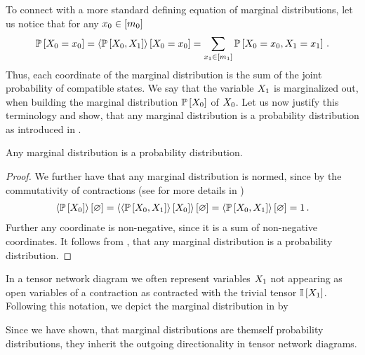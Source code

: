 To connect with a more standard defining equation of marginal distributions, let us notice that for any $x_{0}\in[m_{0}]$
\begin{align*}
    \mathbb{P}\left[X_{0}=x_{0}\right]
    = \left\langle \mathbb{P}\left[X_{0},X_{1}\right]\right\rangle \left[ X_{0}=x_{0} \right]
    = \sum_{x_{1}\in[m_{1}]} \mathbb{P}\left[X_{0}=x_{0},X_{1}=x_{1}\right] \, .
\end{align*}
Thus, each coordinate of the marginal distribution is the sum of the joint probability of compatible states.
We say that the variable $X_{1}$ is marginalized out, when building the marginal distribution $\mathbb{P}\left[X_{0}\right]$ of $X_{0}$.
Let us now justify this terminology and show, that any marginal distribution is a probability distribution as introduced in .

\begin{theorem}
    \label{the:marginalContraction}
    Any marginal distribution is a probability distribution.
\end{theorem}
\begin{proof}
    We further have that any marginal distribution is normed, since by the commutativity of contractions (see for more details  in )
    \begin{align*}
        \left\langle \mathbb{P}\left[X_{0}\right]\right\rangle \left[ \varnothing \right] = \left\langle \left\langle \mathbb{P}\left[X_{0},X_{1}\right]\right\rangle \left[ X_{0} \right]\right\rangle \left[ \varnothing \right] = \left\langle \mathbb{P}\left[X_{0},X_{1}\right]\right\rangle \left[ \varnothing \right] = 1 \, .
    \end{align*}
    Further any coordinate is non-negative, since it is a sum of non-negative coordinates.
    It follows from , that any marginal distribution is a probability distribution.
\end{proof}

In a tensor network diagram we often represent variables $X_{1}$ not appearing as open variables of a contraction as contracted with the trivial tensor $\mathbb{I}\left[X_{1}\right]$.
Following this notation, we depict the marginal distribution in  by
\begin{center}
    
\end{center}
Since we have shown, that marginal distributions are themself probability distributions, they inherit the outgoing directionality in tensor network diagrams.


